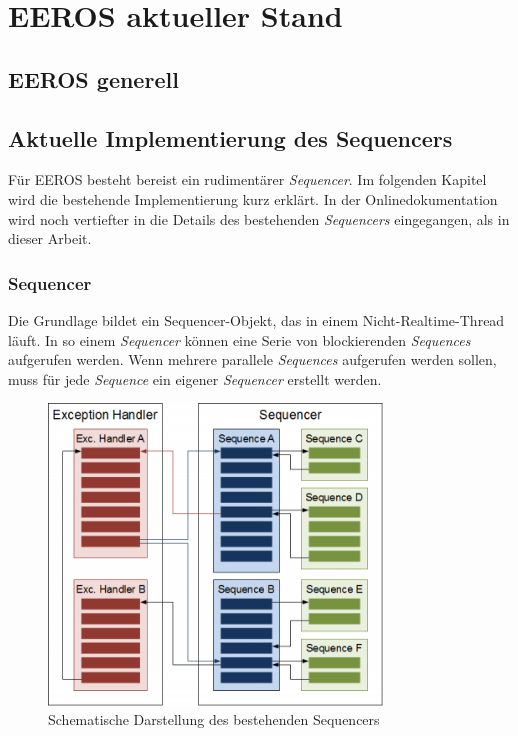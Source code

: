 \chapter{EEROS aktueller Stand}
\section{EEROS generell}


\section{Aktuelle Implementierung des Sequencers}
Für EEROS besteht bereist ein rudimentärer \textit{Sequencer}.
Im folgenden Kapitel wird die bestehende Implementierung kurz erklärt.
In der Onlinedokumentation \cite{eerosOrg} wird noch vertiefter in die Details des bestehenden \textit{Sequencers} eingegangen, als in dieser Arbeit.


\subsection{Sequencer}
Die Grundlage bildet ein Sequencer-Objekt, das in einem Nicht-Realtime-Thread läuft.
In so einem \textit{Sequencer} können eine Serie von blockierenden \textit{Sequences} aufgerufen werden.
Wenn mehrere parallele \textit{Sequences} aufgerufen werden sollen, muss für jede \textit{Sequence} ein eigener \textit{Sequencer} erstellt werden.

\begin{figure}[!ht]
\centering
\includegraphics[angle=0,height=8cm]{images/SequencerBestehend.png}
\caption{Schematische Darstellung des bestehenden Sequencers \cite{eerosWiki}}
\label{sequencerBestehend}
\end{figure}


